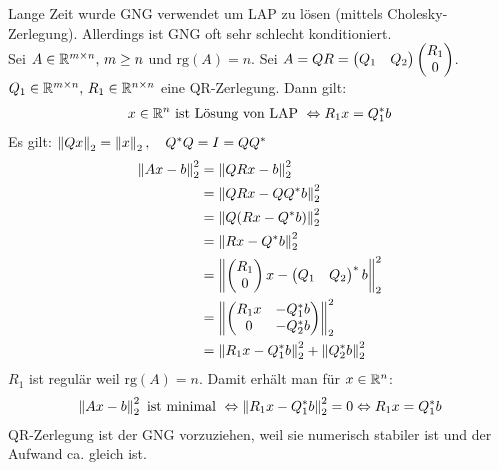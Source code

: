 Lange Zeit wurde GNG verwendet um LAP zu lösen (mittels Cholesky-Zerlegung).
Allerdings ist GNG oft sehr schlecht konditioniert.\\
\satz Sei $A \in \mathbb{R}^{m \times n},\,m \geq n$ und $\mathrm{rg}(A) = n$. Sei $A = QR = \begin{pmatrix} Q_1 & Q_2 \end{pmatrix} \begin{pmatrix} R_1 \\ 0 \end{pmatrix}$.
$Q_1 \in \mathbb{R}^{m \times n},\, R_1 \in \mathbb{R}^{n \times n}$ eine QR-Zerlegung. Dann gilt:
\begin{align*}
  x \in \mathbb{R}^{n} \text{ ist Lösung von LAP } \Leftrightarrow R_1 x = Q_1^* b
\end{align*}
\beweis Es gilt: $\left\lVert Qx \right\rVert_2 = \left\lVert x \right\rVert_2,\quad Q^*Q = I = QQ^*$\\
\begin{align*}
  \left\lVert Ax - b \right\rVert_2^2 &= \left\lVert QRx - b \right\rVert_2^2 \\
  &= \left\lVert QRx - QQ^*b \right\rVert_2^2 \\
  &= \left\lVert Q(Rx - Q^*b) \right\rVert_2^2 \\
  &= \left\lVert Rx - Q^*b \right\rVert_2^2 \\ 
  &= \left\lVert \begin{pmatrix} R_1 \\ 0 \end{pmatrix}x - \begin{pmatrix} Q_1 & Q_2 \end{pmatrix}^* b \right\rVert_2^2\\
  &= \left\lVert \begin{pmatrix} R_1x & -Q_1^*b \\ 0 & -Q_2^*b \end{pmatrix} \right\rVert_2^2 \\
  &= \left\lVert R_1 x - Q_1^*b \right\rVert_2^2 + \left\lVert Q_2^* b \right\rVert_2^2
\end{align*}
$R_1$ ist regulär weil $\mathrm{rg}(A) = n$. Damit erhält man für $x \in \mathbb{R}^{n}$:
\begin{align*}
  \left\lVert Ax -b \right\rVert_2^2 \text{ ist minimal } \Leftrightarrow \left\lVert R_1x - Q_1^*b \right\rVert_2^2 = 0 \Leftrightarrow R_1x = Q_1^*b
\end{align*}
QR-Zerlegung ist der GNG vorzuziehen, weil sie numerisch stabiler ist und der Aufwand ca. gleich ist.

